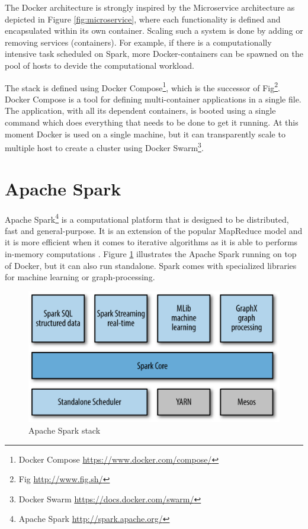 The Docker architecture is strongly inspired by the Microservice architecture as depicted in Figure \ref{fig:microservice}, where each functionality is defined and encapsulated within its own container. Scaling such a system is done by adding or removing services (containers). For example, if there is a computationally intensive task scheduled on Spark, more Docker-containers can be spawned on the pool of hosts to devide the computational workload.

The stack is defined using Docker Compose\footnote{Docker Compose \url{https://www.docker.com/compose/}}, which is the successor of Fig\footnote{Fig \url{http://www.fig.sh/}}. Docker Compose is a tool for defining multi-container applications in a single file. The application, with all its dependent containers, is booted using a single command which does everything that needs to be done to get it running. At this moment Docker is used on a single machine, but it can transparently scale to multiple host to create a cluster using Docker Swarm\footnote{Docker Swarm \url{https://docs.docker.com/swarm/}}. 

\section{Apache Spark \label{subsec_spark}}

Apache Spark\footnote{Apache Spark \url{http://spark.apache.org/}} is a computational platform that is designed to be distributed, fast and general-purpose. It is an extension of the popular MapReduce model \cite{Dean:2008:MSD:1327452.1327492} and it is more efficient when it comes to iterative algorithms as it is able to performs in-memory computations \cite{Xin:2013:SSR:2463676.2465288}. Figure \ref{fig:sparkstack} illustrates the Apache Spark running on top of Docker, but it can also run standalone. Spark comes with specialized libraries for machine learning or graph-processing.

\begin{figure}[ht!]
\centering
\includegraphics[width=.9\textwidth]{figures/sparkstack.png}
\caption{Apache Spark stack \label{fig:sparkstack}}
\end{figure}

